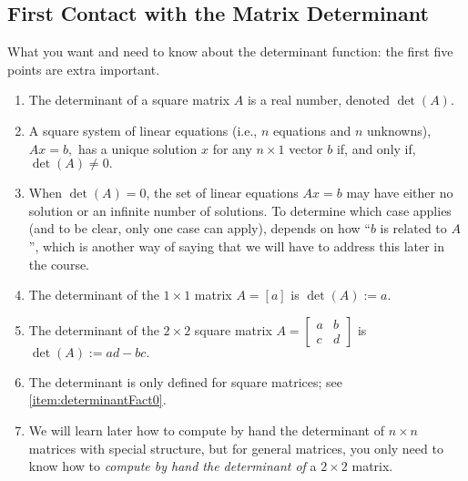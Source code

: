 \subsection{First Contact with the Matrix Determinant}
\label{sec:OperationalDeterminant}




What you want and need to know about the determinant function: the first five points are extra important.

\begin{tcolorbox}[sharp corners, colback=green!30, colframe=green!80!blue, title=\textbf{Enough Facts about the Determinant to Get Us Going}]
\begin{enumerate}[label={Fact~}{\arabic*}]

\item \label{item:determinantFact0}  The determinant of a square matrix $A$ is a real number, denoted $\det(A)$.

    \item \label{item:determinantFact1} A square system of linear equations (i.e.,  $n$ equations and $n$ unknowns), 
    $Ax=b,$
    has a unique solution $x$ for any $n\times 1$ vector $b$ if, and only if, $\det(A) \neq 0.$
    
     \item When $\det(A)=0$, the set of linear equations $Ax=b$ may have either no solution or an infinite number of solutions. To determine which case applies (and to be clear, only one case can apply), depends on how ``$b$ is related to $A$'', which is another way of saying that we will have to address this later in the course. 
     
     \item The determinant of the $1 \times 1$ matrix $A=[a]$ is $\det(A):=a$.
     
    \item The determinant of the $2 \times 2$ square matrix 
    $A=\left[\begin{array}{cc} a & b \\ c & d \end{array} \right]$ is
  $\det(A):= a d - bc.$
 
     \item The determinant is only defined for square matrices; see~ \ref{item:determinantFact0}.
     
       \item We will learn later how to compute by hand the determinant of $n \times n$ matrices with special structure, but for general matrices, you only need to know how to \textit{compute by hand the determinant of} a $2 \times 2$ matrix.
 
\end{enumerate}

\end{tcolorbox}



